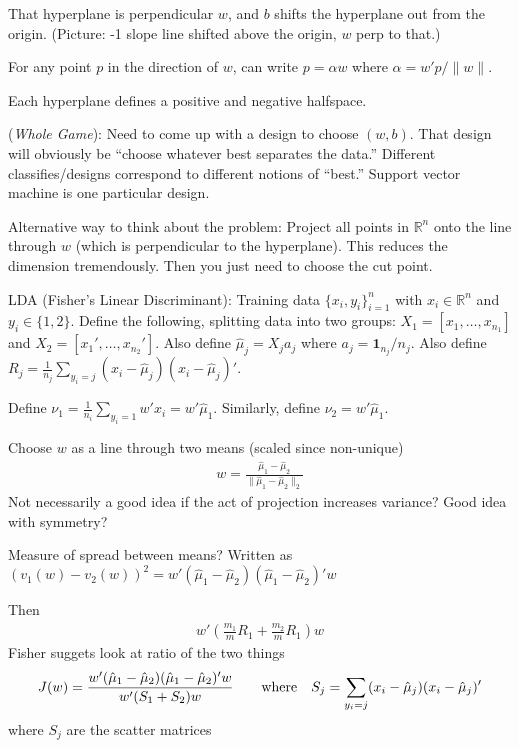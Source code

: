 \documentclass[12pt]{article}
\numberwithin{equation}{section} %
\theoremstyle{plain}
\theoremstyle{definition}
\theoremstyle{remark}
\newcommand{\R}{\mathbb{R}}
\newcommand{\Rn}{\mathbb{R}^n}
\begin{document}
That hyperplane is perpendicular $w$, and $b$ shifts the hyperplane out
from the origin.
(Picture: -1 slope line shifted above the origin, $w$ perp to that.)

For any point $p$ in the direction of $w$, can write $p=\alpha w$
where $\alpha =w'p/\lVert w\rVert$.

Each hyperplane defines a positive and negative halfspace.

(\emph{Whole Game}): Need to come up with a design to choose $(w,b)$.
That design will obviously be ``choose whatever best separates the
data.'' Different classifies/designs correspond to different notions of
``best.'' Support vector machine is one particular design.

Alternative way to think about the problem: Project all points in $\Rn$
onto the line through $w$ (which is perpendicular to the hyperplane).
This reduces the dimension tremendously.
Then you just need to choose the cut point.

LDA (Fisher's Linear Discriminant):
Training data $\{x_i,y_i\}_{i=1}^n$ with $x_i\in\R^n$ and
$y_i\in\{1,2\}$.
Define the following, splitting data into two groups:
$X_1=[x_1,\ldots,x_{n_1}]$ and $X_2=[x_1',\ldots,x_{n_2}']$.
Also define $\hat{\mu}_j=X_j a_j$ where $a_j = \mathbf{1}_{n_j}/n_j$.
Also define
$R_j = \frac{1}{n_j} \sum_{y_i=j} (x_i-\hat{\mu}_j)(x_i-\hat{\mu}_j)'$.

Define $\nu_1=\frac{1}{n_i}\sum_{y_i=1} w'x_i=w'\hat{\mu}_1$.
Similarly, define $\nu_2=w'\hat{\mu}_1$.

Choose $w$ as a line through two means (scaled since non-unique)
\begin{align*}
  w=\frac{\hat{\mu}_1-\hat{\mu}_2}{\lVert
    \hat{\mu}_1-\hat{\mu}_2\rVert_2}
\end{align*}
Not necessarily a good idea if the act of projection increases variance?
Good idea with symmetry?

Measure of spread between means?
Written as
$(v_1(w)-v_2(w))^2=w'(\hat{\mu}_1-\hat{\mu}_2)(\hat{\mu}_1-\hat{\mu}_2)'w$

Then
\begin{align*}
  w'\left(
  \frac{m_1}{m}R_1
  +
  \frac{m_2}{m}R_1
  \right)w
\end{align*}
Fisher suggets look at ratio of the two things
\begin{align*}
  J(w)=
  \frac{%
    w'(\hat{\mu}_1-\hat{\mu}_2)(\hat{\mu}_1-\hat{\mu}_2)'w
  }{%
    w'(S_1+S_2)w
  }
  \qquad\text{where}\quad
  S_j
  = \sum_{y_i=j} (x_i-\hat{\mu}_j)(x_i-\hat{\mu}_j)'
\end{align*}
where $S_j$ are the scatter matrices
\end{document}
